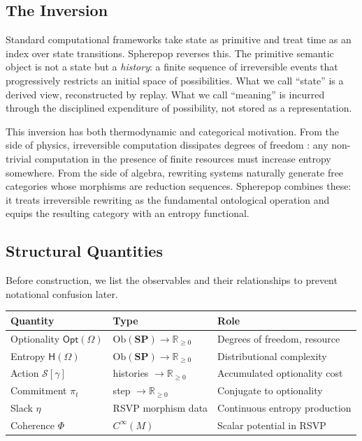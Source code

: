 \documentclass[12pt,a4paper]{article}
\theoremstyle{definition}
\theoremstyle{remark}
\newcommand{\Rnn}{\mathbb{R}_{\ge 0}}
\newcommand{\Ent}{\mathsf{H}}
\newcommand{\Opt}{\mathsf{Opt}}
\newcommand{\SP}{\mathbf{SP}}
\newcommand{\Ob}{\mathrm{Ob}}
\newcommand{\PhiF}{\Phi}
\begin{document}
\subsection{The Inversion}

Standard computational frameworks take state as primitive and treat time as an index
over state transitions. Spherepop reverses this. The primitive semantic object is not
a state but a \emph{history}: a finite sequence of irreversible events that progressively
restricts an initial space of possibilities. What we call ``state'' is a derived view,
reconstructed by replay. What we call ``meaning'' is incurred through the disciplined
expenditure of possibility, not stored as a representation.

This inversion has both thermodynamic and categorical motivation. From the side of
physics, irreversible computation dissipates degrees of freedom \citep{landauer1961,
bennett1973, GreenAltenkirch2006}: any non-trivial computation in the presence of finite resources must
increase entropy somewhere. From the side of algebra, rewriting systems naturally
generate free categories whose morphisms are reduction sequences. Spherepop combines
these: it treats irreversible rewriting as the fundamental ontological operation and
equips the resulting category with an entropy functional.

\subsection{Structural Quantities}

Before construction, we list the observables and their relationships to prevent
notational confusion later.

\begin{center}
\renewcommand{\arraystretch}{1.4}
\begin{tabular}{lll}
\toprule
\textbf{Quantity} & \textbf{Type} & \textbf{Role} \\
\midrule
Optionality $\Opt(\Omega)$ & $\Ob(\SP)\to\Rnn$ & Degrees of freedom, resource \\
Entropy $\Ent(\Omega)$ & $\Ob(\SP)\to\Rnn$ & Distributional complexity \\
Action $\mathcal{S}[\gamma]$ & histories $\to\Rnn$ & Accumulated optionality cost \\
Commitment $\pi_t$ & step $\to\Rnn$ & Conjugate to optionality \\
Slack $\eta$ & RSVP morphism data & Continuous entropy production \\
Coherence $\PhiF$ & $C^\infty(M)$ & Scalar potential in RSVP \\
\bottomrule
\end{tabular}
\end{center}
\end{document}
